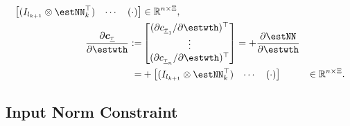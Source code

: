 \documentclass[lettersize,journal]{IEEEtran}
\begin{document}
\begin{appendices}
\begin{equation}
\begin{aligned}
\begin{bmatrix}
            (I_{l_{k+1}}\otimes \estNN_{k}^\top)&
            \cdots &
            (
            \cdot
            )
        \end{bmatrix} 
        &
        \in
        \mathbb R^{n\times \Xi}
        , 
        \\
        {\partial \boldsymbol c_{\underline\tau} \over \partial \estwth}         
        :=
        & 
        \begin{bmatrix}
            (\partial c_{\underline\tau_1}/\partial \estwth)^\top \\
            \vdots \\
            (\partial c_{\underline\tau_n}/\partial \estwth)^\top
        \end{bmatrix}
        = +{\partial \estNN\over\partial\estwth}
        \\
        =&
        +\begin{bmatrix}
            (I_{l_{k+1}}\otimes \estNN_{k}^\top)&
            \cdots &
            (
            \cdot
            )
        \end{bmatrix} 
        &
        \in
        \mathbb R^{n\times \Xi}
        .
    \end{aligned}
    \label{eq. nabla input sat}
\end{equation}

\subsection{Input Norm Constraint}\label{sec:appen:input_norm_cstr}


\end{appendices}
\end{document}
